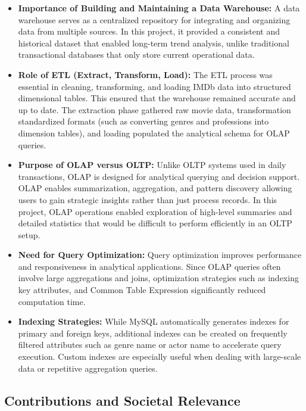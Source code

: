 \documentclass[sigconf, pbalance]{acmart}
\begin{document}
\begin{itemize}
	\item \textbf{Importance of Building and Maintaining a Data Warehouse:}  
	A data warehouse serves as a centralized repository for integrating and organizing data from multiple sources. In this project, it provided a consistent and historical dataset that enabled long-term trend analysis, unlike traditional transactional databases that only store current operational data.
	
	\item \textbf{Role of ETL (Extract, Transform, Load):}  
	The ETL process was essential in cleaning, transforming, and loading IMDb data into structured dimensional tables. This ensured that the warehouse remained accurate and up to date. The extraction phase gathered raw movie data, transformation standardized formats (such as converting genres and professions into dimension tables), and loading populated the analytical schema for OLAP queries.
	
	\item \textbf{Purpose of OLAP versus OLTP:}  
	Unlike OLTP systems used in daily transactions, OLAP is designed for analytical querying and decision support. OLAP enables summarization, aggregation, and pattern discovery allowing users to gain strategic insights rather than just process records. In this project, OLAP operations enabled exploration of high-level summaries and detailed statistics that would be difficult to perform efficiently in an OLTP setup.
	
	\item \textbf{Need for Query Optimization:}  
	Query optimization improves performance and responsiveness in analytical applications. Since OLAP queries often involve large aggregations and joins, optimization strategies such as indexing key attributes, and Common Table Expression significantly reduced computation time. 
	
	\item \textbf{Indexing Strategies:}  
	While MySQL automatically generates indexes for primary and foreign keys, additional indexes can be created on frequently filtered attributes such as genre name or actor name to accelerate query execution. Custom indexes are especially useful when dealing with large-scale data or repetitive aggregation queries.
\end{itemize}

\subsection{Contributions and Societal Relevance}
\end{document}
